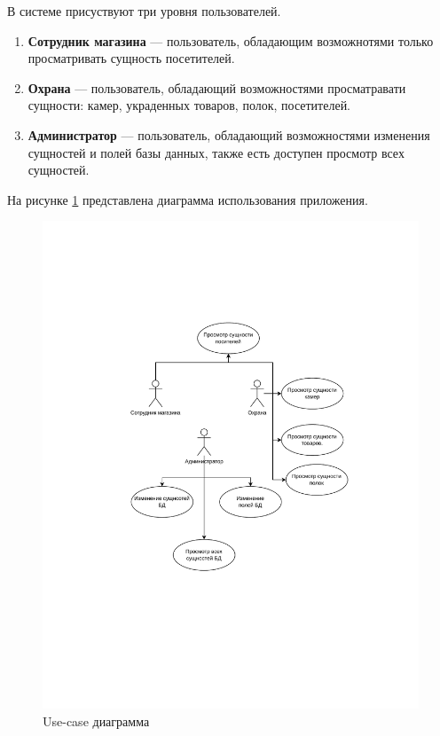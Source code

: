 В системе присуствуют три уровня пользователей.

\begin{enumerate}[label=\arabic*.]
    \item \textbf{Сотрудник магазина} --- пользователь, обладающим возможнотями только просматривать
    сущность посетителей.
	\item \textbf{Охрана} --- пользователь, обладающий возможностями просматравати сущности: камер,
	украденных товаров, полок, посетителей.
	\item \textbf{Администратор} --- пользователь, обладающий возможностями изменения сущностей и полей
	базы данных, также есть доступен просмотр всех сущностей.
\end{enumerate}

На рисунке \ref{fig:anal:use-case} представлена диаграмма использования приложения.

\begin{figure}[ht!]
	\centering
	\includegraphics[width=1\linewidth]{assets/images/Use-case.drawio.pdf}
	\caption{Use-case диаграмма}
	\label{fig:anal:use-case}
\end{figure}
\FloatBarrier

